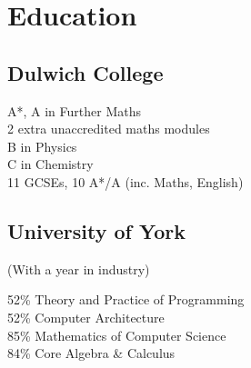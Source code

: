 \documentclass[a4paper]{cv}
\begin{document}
\begin{minipage}[t]{0.66\textwidth}
\sectionspace %


\section{Education} 

\begin{minipage}[t]{0.4\textwidth}
\subsection{Dulwich College}

A*, A in Further Maths \\
2 extra unaccredited maths modules \\
B in Physics \\
C in Chemistry \\\vspace{4pt}
11 GCSEs, 10 A*/A (inc. Maths, English)

\end{minipage}
\begin{minipage}[t]{0.55\textwidth}
\subsection{University of York}

(With a year in industry) \\\vspace{4pt}
\vspace{4pt}

52\% Theory and Practice of Programming \\
52\% Computer Architecture \\
85\% Mathematics of Computer Science \\
84\% Core Algebra \& Calculus

\end{minipage}

\sectionspace %


\end{minipage}
\end{document}
